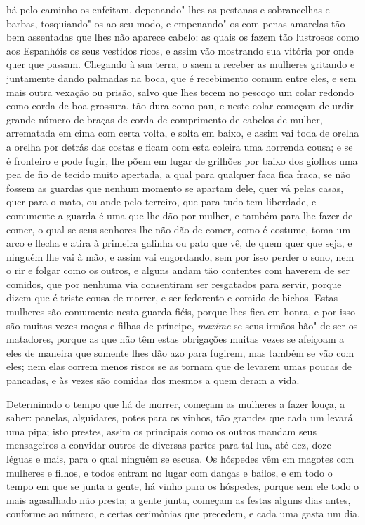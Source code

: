\begin{linenumbers}
há pelo caminho os enfeitam, depenando"-lhes as pestanas e sobrancelhas
e barbas, tosquiando"-os ao seu modo, e empenando"-os com penas amarelas
tão bem assentadas que lhes não aparece cabelo: as quais os fazem tão
lustrosos como aos Espanhóis os seus vestidos ricos, e assim vão
mostrando sua vitória por onde quer que passam. Chegando à sua terra,
o saem a receber as mulheres gritando e juntamente dando palmadas na
boca, que é recebimento comum entre eles, e sem mais outra vexação ou
prisão, salvo que lhes tecem no pescoço um colar redondo como corda de
boa grossura, tão dura como pau, e neste colar começam de urdir grande
número de braças de corda de comprimento de cabelos de mulher,
arrematada em cima com certa volta, e solta em baixo, e assim vai toda
de orelha a orelha por detrás das costas e ficam com esta coleira uma
horrenda cousa; e se é fronteiro e pode fugir, lhe põem em lugar de
grilhões por baixo dos giolhos uma pea de fio de tecido muito apertada,
a qual para qualquer faca fica fraca, se não fossem as guardas que
nenhum momento se apartam dele, quer vá pelas casas, quer para o mato,
ou ande pelo terreiro, que para tudo tem liberdade, e comumente a
guarda é uma que lhe dão por mulher, e também para lhe fazer de comer,
o qual se seus senhores lhe não dão de comer, como é costume, toma um
arco e flecha e atira à primeira galinha ou pato que vê, de quem quer
que seja, e ninguém lhe vai à mão, e assim vai engordando, sem por isso
perder o sono, nem o rir e folgar como os outros, e alguns andam tão
contentes com haverem de ser comidos, que por nenhuma via consentiram
ser resgatados para servir, porque dizem que é triste cousa de morrer,
e ser fedorento e comido de bichos. Estas mulheres são comumente nesta
guarda fiéis, porque lhes fica em honra, e por isso são muitas vezes
moças e filhas de príncipe, \textit{maxime} se seus irmãos hão"-de ser os
matadores, porque as que não têm estas obrigações muitas vezes se
afeiçoam a eles de maneira que somente lhes dão azo para fugirem, mas
também se vão com eles; nem elas correm menos riscos se as tornam que
de levarem umas poucas de pancadas, e às vezes são comidas dos mesmos a
quem deram a vida.

 Determinado o tempo que há de morrer, começam as mulheres a fazer
louça, a saber: panelas, alguidares, potes para os vinhos, tão grandes
que cada um levará uma pipa; isto prestes, assim os principais como os
outros mandam seus mensageiros a convidar outros de diversas partes
para tal lua, até dez, doze léguas e mais, para o qual ninguém se
escusa. Os hóspedes vêm em magotes com mulheres e filhos, e todos
entram no lugar com danças e bailos, e em todo o tempo em que se junta
a gente, há vinho para os hóspedes, porque sem ele todo o mais
agasalhado não presta; a gente junta, começam as festas alguns dias
antes, conforme ao número, e certas cerimônias que precedem, e cada uma
gasta um dia.


\end{linenumbers}
